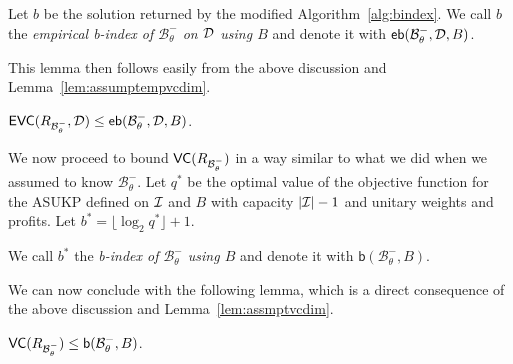 \begin{definition}\label{def:empbindex}
  Let $b$ be the solution returned by the modified Algorithm~\ref{alg:bindex}.
  We call $b$ the \emph{empirical b-index of $\mathcal{B}^-_\theta$ on ${\cal D}$
  using $B$} and denote it with $\mathsf{eb}(\mathcal{B}^-_\theta,{\cal D},B)$.
\end{definition}

This lemma then follows easily from the above discussion and
Lemma~\ref{lem:assumptempvcdim}.
\begin{lemma}\label{lem:empbindexbound}
  $\mathsf{EVC}(R_{\mathcal{B}^-_\theta},{\cal D})\le\mathsf{eb}(\mathcal{B}^-_\theta,{\cal D},B)$.
\end{lemma}

We now proceed to bound $\mathsf{VC}(R_{\mathcal{B}^-_\theta})$ in a way similar to what
we did when we assumed to know $\mathcal{B}^-_\theta$.
Let $q^*$ be the optimal value of the objective function for the ASUKP defined on
${\cal I}$ and $B$ with capacity $|{\cal I}|-1$ and unitary weights and profits. Let
$b^*=\lfloor\log_2 q^*\rfloor+1$.

\begin{definition}\label{def:bindex}
  We call $b^*$ the \emph{b-index of $\mathcal{B}^-_\theta$ using $B$} and
  denote it with $\mathsf{b}(\mathcal{B}^-_\theta,B)$.
\end{definition}

We can now conclude with the following lemma, which is a direct consequence of
the above discussion and Lemma~\ref{lem:assmptvcdim}.
\begin{lemma}\label{lem:bindexbound}
  $\mathsf{VC}(R_{\mathcal{B}^-_\theta})\le\mathsf{b}(\mathcal{B}^-_\theta,B)$.
\end{lemma}

\iffalse
\subsubsection{A lower bound to the VC-dimension of $R_{\mathcal{B}^-_\theta}$}
One may ask how tight the (empirical) b-index is as an upper bound to the
(empirical) VC-dimension of the range set of the negative border of RFI's. We
have the following results, showing that the bound is optimal for a family\dots
({\bf XXX:} A family of what? Datasets? Distributions (distribution on what?)
\begin{lemma}
  There are datasets and distributions for which the bound is strict
\end{lemma}
\begin{proof}
  TBD
\end{proof}
\fi

